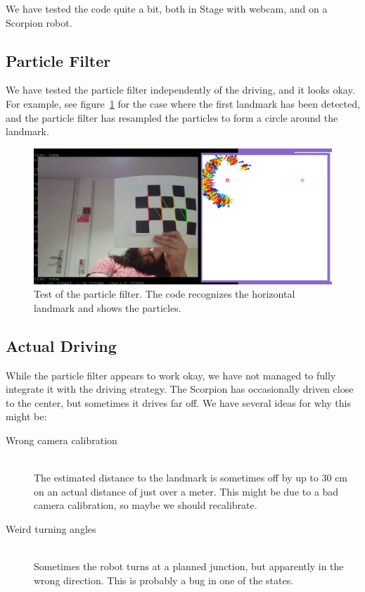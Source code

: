 \documentclass[a4paper,12pt]{article}
\begin{document}
We have tested the code quite a bit, both in Stage with webcam, and on a
Scorpion robot.

\subsection{Particle Filter}

We have tested the particle filter independently of the driving, and it looks
okay.  For example, see figure~\ref{fig:particle-test} for the case where the
first landmark has been detected, and the particle filter has resampled the
particles to form a circle around the landmark.

\begin{figure}[!h]
\centering
\includegraphics[width=.9\textwidth]{partikeltest.png}
\caption{Test of the particle filter.  The code recognizes the horizontal
landmark and shows the particles.}
\label{fig:particle-test}
\end{figure}


\subsection{Actual Driving}

While the particle filter appears to work okay, we have not managed to fully
integrate it with the driving strategy.  The Scorpion has occasionally driven
close to the center, but sometimes it drives far off.  We have several ideas for
why this might be:

\begin{description}
\item[Wrong camera calibration]\hfill\\
The estimated distance to the landmark is sometimes off by up to 30 cm on an
actual distance of just over a meter.  This might be due to a bad camera
calibration, so maybe we should recalibrate.

\item[Weird turning angles]\hfill\\
Sometimes the robot turns at a planned junction, but apparently in the wrong
direction.  This is probably a bug in one of the states.
\end{description}
\end{document}

